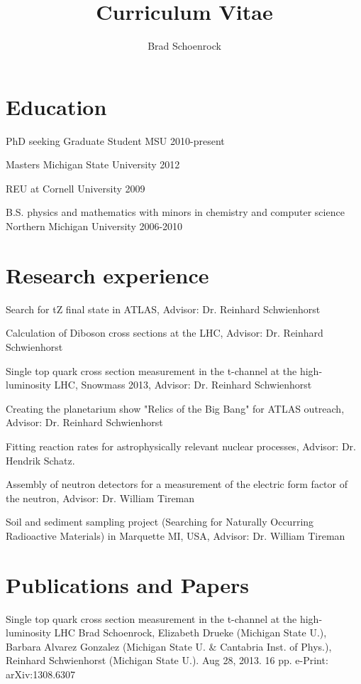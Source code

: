 \documentclass{article}
\title{Curriculum Vitae}
\author{Brad Schoenrock}
\date{}
\begin{document}
\maketitle
\large


\section{Education}
\hspace{0.5cm}PhD seeking Graduate Student MSU 2010-present

Masters Michigan State University 2012

REU at Cornell University 2009

B.S. physics and mathematics with minors in chemistry and computer science Northern Michigan University 2006-2010


\section{Research experience}
\hspace{0.5cm}Search for tZ final state in ATLAS, Advisor: Dr. Reinhard Schwienhorst

Calculation of Diboson cross sections at the LHC, Advisor: Dr. Reinhard Schwienhorst

Single top quark cross section measurement in the t-channel at the high-luminosity LHC, Snowmass 2013,  Advisor: Dr. Reinhard Schwienhorst

Creating the planetarium show "Relics of the Big Bang" for ATLAS outreach, Advisor: Dr. Reinhard Schwienhorst

Fitting reaction rates for astrophysically relevant nuclear processes, Advisor: Dr. Hendrik Schatz. 

Assembly of neutron detectors for a measurement of the electric form factor of the neutron, Advisor: Dr. William Tireman

Soil and sediment sampling project (Searching for Naturally Occurring Radioactive Materials) in Marquette MI, USA, Advisor: Dr. William Tireman


\section{Publications and Papers}
\hspace{0.5cm}Single top quark cross section measurement in the t-channel at the high-luminosity LHC
Brad Schoenrock, Elizabeth Drueke (Michigan State U.), Barbara Alvarez Gonzalez (Michigan State U. \& Cantabria Inst. of Phys.), Reinhard Schwienhorst (Michigan State U.). Aug 28, 2013. 16 pp.
e-Print: arXiv:1308.6307
\end{document}

